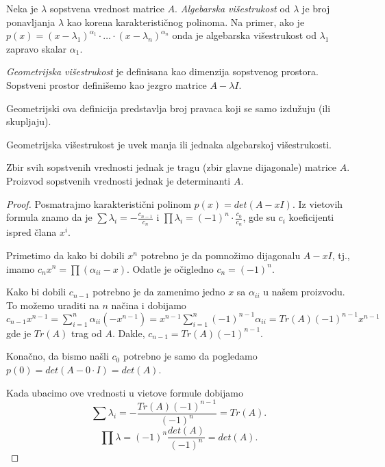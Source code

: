 \documentclass{article}
\begin{document}
\begin{definition}
  Neka je $\lambda$ sopstvena vrednost matrice $A$.
  \textit{Algebarska višestrukost} od $\lambda$ je broj ponavljanja $\lambda$ kao korena karakterističnog polinoma.
  Na primer, ako je $p(x) = (x - \lambda_1)^{\alpha_1} \cdot \ldots \cdot (x - \lambda_n)^{\alpha_n}$ onda je algebarska višestrukost od $\lambda_1$ zapravo skalar $\alpha_1$.
\end{definition}

\begin{definition}
  \textit{Geometrijska višestrukost} je definisana kao dimenzija sopstvenog prostora.
  Sopstveni prostor definišemo kao jezgro matrice $A - \lambda I$.
\end{definition}

Geometrijski ova definicija predstavlja broj pravaca koji se samo izdužuju (ili skupljaju).

\begin{theorem}
  Geometrijska višestrukost je uvek manja ili jednaka algebarskoj višestrukosti.
\end{theorem}

\begin{theorem}
  Zbir svih sopstvenih vrednosti jednak je tragu (zbir glavne dijagonale) matrice $A$.
  Proizvod sopstvenih vrednosti jednak je determinanti $A$.
\end{theorem}

\begin{proof}
  Posmatrajmo karakteristični polinom $p(x) = det(A - x I)$.
  Iz vietovih formula znamo da je $\sum \lambda_i = -\frac{c_{n - 1}}{c_n}$ i $\prod \lambda_i = (-1)^n \cdot \frac{c_0}{c_n}$, gde su $c_i$ koeficijenti ispred člana $x^i$.

  Primetimo da kako bi dobili $x^n$ potrebno je da pomnožimo dijagonalu $A - x I$, tj., imamo $c_n x^n = \prod (\alpha_{ii} - x)$.
  Odatle je očigledno $c_n = (-1)^n$.

  Kako bi dobili $c_{n - 1}$ potrebno je da zamenimo jedno $x$ sa $\alpha_{ii}$ u našem proizvodu.
  To možemo uraditi na $n$ načina i dobijamo $c_{n - 1} x^{n - 1} = \sum_{i = 1}^{n} \alpha_{ii} (-x^{n - 1}) = x^{n - 1} \sum_{i = 1}^{n} (-1)^{n - 1} \alpha_{ii} = Tr(A) (-1)^{n - 1} x^{n - 1}$ gde je $Tr(A)$ trag od $A$.
  Dakle, $c_{n - 1} = Tr(A) (-1)^{n - 1}$.

  Konačno, da bismo našli $c_0$ potrebno je samo da pogledamo $p(0) = det(A - 0 \cdot I) = det(A)$.

  Kada ubacimo ove vrednosti u vietove formule dobijamo
  \[\sum \lambda_i = -\frac{Tr(A) (-1)^{n - 1}}{(-1)^n} = Tr(A).\]
  \[\prod \lambda = (-1)^n \frac{det(A)}{(-1)^n} = det(A).\]
\end{proof}
\end{document}
